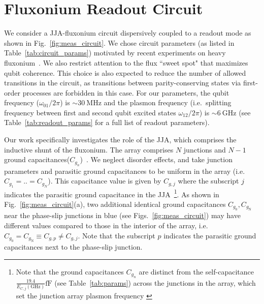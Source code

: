 \documentclass[%
reprint,
superscriptaddress,
 amsmath,amssymb,
 aps,
 prx,
longbibliography,
floatfix,
]{revtex4-2}
\begin{document}
\section{Fluxonium Readout Circuit}\label{sec:Fluxonium}


We consider a JJA-fluxonium circuit dispersively coupled to a readout mode as shown in Fig.~\ref{fig:meas_circuit}. We chose circuit parameters (as listed in Table~\ref{tab:circuit_params}) motivated by recent experiments on heavy fluxonium~\cite{zhang_tunable_2024,zhang_universal_2021, ding_high-fidelity_2023}.  We also restrict attention to the flux ``sweet spot" that maximizes qubit coherence.
This choice is also expected to reduce the number of allowed transitions in the circuit, as transitions between parity-conserving states via first-order processes are forbidden in this case. For our parameters, the qubit frequency ($\omega_{01}/2\pi$) is $\sim 30 \ \mathrm{MHz}$ and the plasmon frequency (i.e.~splitting frequency between first and second qubit excited states $\omega_{12}/2\pi$) is $\sim 6 \ \mathrm{GHz}$ (see Table~\ref{tab:readout_params} for a full list of readout parameters).
 

Our work specifically investigates the role of the JJA, which comprises the inductive shunt of the fluxonium. The array comprises $N$ junctions and $N-1$ ground capacitances($C_{g_n}$)~\cite{manucharyan2009fluxonium}. We neglect disorder effects, and take junction parameters and parasitic ground capacitances to be uniform in the array (i.e.~$C_{g_1}=..=C_{g_{N}}$). This capacitance value is given by $C_{g,j}$ where the subscript $j$ indicates the parasitic ground capacitance in the JJA~\footnote{Note that the ground capacitances $C_{g_n}$ are distinct from the self-capacitance $\frac{19.4}{E_{C,j}(\mathrm{GHz})}\mathrm{fF}$ (see Table~\ref{tab:params}) across the junctions in the array, which set the junction array plasmon frequency \cite{catelani2011relaxation}}. As shown in Fig.~\ref{fig:meas_circuit}(a), 
two additional identical ground capacitances $C_{g_0}, C_{g_\textrm{N}}$ near the phase-slip junctions in blue (see Figs.~\ref{fig:meas_circuit}) may have different values compared to those in the interior of the array, i.e.~
$C_{g_0}=C_{g_\textrm{N}}\equiv C_{g,p}\neq C_{g, j}$. Note that the subscript $p$ indicates the parasitic ground capacitances next to the phase-slip junction.
\end{document}
